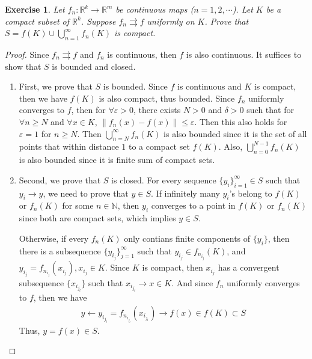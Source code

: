 \documentclass[11pt]{article}
\newtheorem{exercise}{Exercise}[section]
\theoremstyle{definition}
\numberwithin{equation}{subsection}
\begin{document}
\medskip

\begin{exercise}{\rm *}\label{May_2016_3}
Let $f_n: \mathbb{R}^k \to \mathbb{R}^m$ be continuous maps ($n = 1,2, \cdots$). Let $K$ be a compact subset of $\mathbb{R}^k$. Suppose $f_n \rightrightarrows f$ uniformly on $K$. Prove that $S = f(K) \cup \bigcup^\infty_{n=1} f_n(K)$ is compact.
\end{exercise}
\begin{proof}
Since $f_n \rightrightarrows f$ and $f_n$ is continuous, then $f$ is also continuous. It suffices to show that $S$ is bounded and closed.
\begin{enumerate}[label=(\alph*)]
    \item First, we prove that $S$ is bounded. Since $f$ is continuous and $K$ is compact, then we have $f(K)$ is also compact, thus bounded. Since $f_n$ uniformly converges to $f$, then for $\forall\varepsilon > 0$, there exists $N > 0$ and $\delta > 0$ such that for $\forall n \geq N$ and $\forall x\in K$, $\|f_n(x) - f(x)\| \leq \varepsilon$. Then this also holds for $\varepsilon = 1$ for $n \geq N$. Then $\bigcup^\infty_{n = N}f_n(K)$ is also bounded since it is the set of all points that within distance $1$ to a compact set $f(K)$.  Also, $\bigcup^{N-1}_{n = 0}f_n(K)$ is also bounded since it is finite sum of compact sets.
    
    \item Second, we prove that $S$ is closed. For every sequence $\{y_i\}^\infty_{i=1}\in S$ such that $y_i\to y$, we need to prove that $y\in S$. If infinitely many $y_i$'s belong to $f(K)$ or $f_n(K)$ for some $n\in\mathbb{N}$, then $y_i$ converges to a point in $f(K)$ or $f_n(K)$ since both are compact sets, which implies $y\in S$. 
    
    Otherwise, if every $f_n(K)$ only contians finite components of $\{y_i\}$, then there is a subsequence $\{y_{i_j}\}^\infty_{j = 1}$ such that $y_{i_j}\in f_{n_{i_j}}(K)$, and $y_{i_j} = f_{n_{i_j}}(x_{i_j}), x_{i_j}\in K$. Since $K$ is compact, then $x_{i_j}$ has a convergent subsequence $\{x_{i_{j_l}}\}$ such that $x_{i_{j_l}} \to x \in K$. And since $f_n$ uniformly converges to $f$, then we have 
    \begin{align*}
        y\leftarrow y_{i_{j_l}} = f_{n_{i_{j_l}}}\left(x_{i_{j_l}} \right) \to f(x)\in f(K) \subset S
    \end{align*}
    Thus, $y = f(x)\in S$.
\end{enumerate}
\end{proof}
\end{document}
